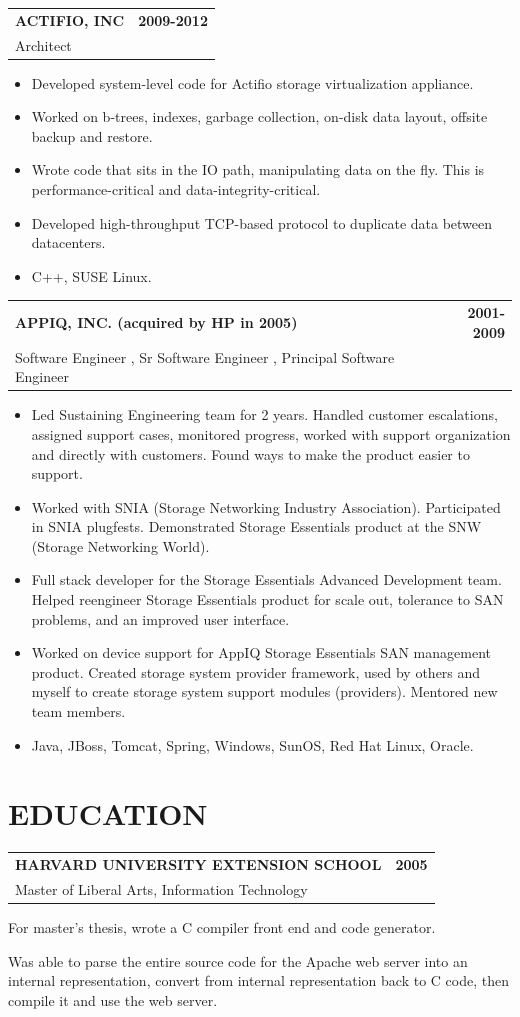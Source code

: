 \documentclass[11pt]{article}
\makeatletter
\newcommand{\resheader}[1]{\section*{#1}\vspace{-4pt}}
\newcommand{\jobheading}[4]{%
  \vspace{6pt}\begin{tabularx}{\textwidth}{@{}X r@{}}
    {\textbf{#1}} & {\textbf{#2}} \\
    {{\normalsize #3}\hspace{0.5em}{\color{muted}·}\hspace{0.5em}{\color{muted}#4}} & {} \\
  \end{tabularx}\vspace{2pt}
}
\makeatother
\begin{document}
\jobheading{ACTIFIO, INC}{2009-2012}{Architect}{Waltham, MA}
\begin{itemize}
\item Developed system-level code for Actifio storage virtualization appliance.
\item Worked on b-trees, indexes, garbage collection, on-disk data layout, offsite backup and restore.
\item Wrote code that sits in the IO path, manipulating data on the fly. This is performance-critical and data-integrity-critical.
\item Developed high-throughput TCP-based protocol to duplicate data between datacenters.
\item C++, SUSE Linux.
\end{itemize}

\jobheading{APPIQ, INC. (acquired by HP in 2005)}{2001-2009}{Software Engineer , Sr Software Engineer , Principal Software Engineer}{Marlborough, MA}
\begin{itemize}
\item Led Sustaining Engineering team for 2 years. Handled customer escalations, assigned support cases, monitored progress, worked with support organization and directly with customers. Found ways to make the product easier to support.
\item Worked with SNIA (Storage Networking Industry Association). Participated in SNIA plugfests. Demonstrated Storage Essentials product at the SNW (Storage Networking World).
\item Full stack developer for the Storage Essentials Advanced Development team. Helped reengineer Storage Essentials product for scale out, tolerance to SAN problems, and an improved user interface.
\item Worked on device support for AppIQ Storage Essentials SAN management product. Created storage system provider framework, used by others and myself to create storage system support modules (providers). Mentored new team members.
\item Java, JBoss, Tomcat, Spring, Windows, SunOS, Red Hat Linux, Oracle.
\end{itemize}

\resheader{EDUCATION}

\jobheading{HARVARD UNIVERSITY EXTENSION SCHOOL}{2005}{Master of Liberal Arts, Information Technology}{Cambridge, MA}

For master's thesis, wrote a C compiler front end and code generator.

Was able to parse the entire source code for the Apache web server into an internal representation, convert from internal representation back to C code, then compile it and use the web server.
\end{document}
